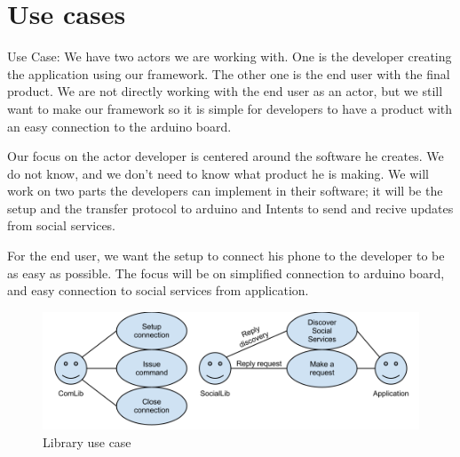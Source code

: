 \section{Use cases}
Use Case:
We have two actors we are working with. One is the developer creating the application using our framework.
The other one is the end user with the final product. We are not directly working with the end user as an actor,
but we still want to make our framework so it is simple for developers to have a product with an easy connection to the arduino board.

Our focus on the actor developer is centered around the software he creates. We do not know, and we don't need to
know what product he is making. We will work on two parts the developers can implement in their software; it will be the setup and the transfer protocol to arduino and Intents to send and recive updates from social services.

For the end user, we want the setup to connect his phone to the developer to be as easy as possible. The focus will be on
simplified connection to arduino board, and easy connection to social services from application.

\begin{figure}[hb!]
\centering \includegraphics[scale=0.40]{img/design-libusecase.png}
\caption{Library use case}
\label{fig:design-libusecase}
\end{figure}
